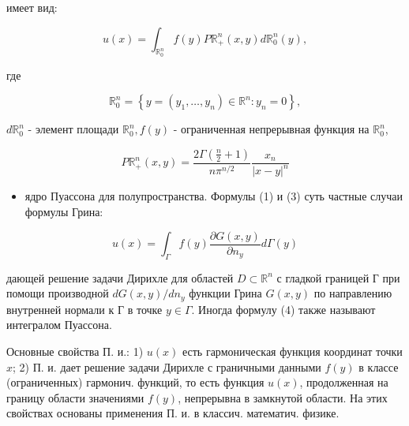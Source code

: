 \documentclass[10pt]{article}
\begin{document}
имеет вид:



\[

u(x)=\int_{\mathbb{R}_{0}^{n}} f(y) P \mathbb{R}_{+}^{n}(x, y) d \mathbb{R}_{0}^{n}(y),

\]



где



\[

\mathbb{R}_{0}^{n}=\left\{y=\left(y_{1}, \ldots, y_{n}\right) \in \mathbb{R}^{n}: y_{n}=0\right\},

\]



$d \mathbb{R}_{0}^{n}$ - элемент площади $\mathbb{R}_{0}^{n}, f(y)$ - ограниченная непрерывная функция на $\mathbb{R}_{0}^{n}$,



\[

P \mathbb{R}_{+}^{n}(x, y)=\frac{2 \Gamma\left(\frac{n}{2}+1\right)}{n \pi^{n / 2}} \frac{x_{n}}{|x-y|^{n}}

\]



\begin{itemize}

  \item ядро Пуассона для полупространства. Формулы (1) и (3) суть частные случаи формулы Грина:

\end{itemize}



\[

u(x)=\int_{\Gamma} f(y) \frac{\partial G(x, y)}{\partial n_{y}} d \Gamma(y)

\]



дающей решение задачи Дирихле для областей $D \subset \mathbb{R}^{n}$ с гладкой границей Г при помощи производной $d G(x, y) / d n_{y}$ функции Грина $G(x, y)$ по направлению внутренней нормали к Г в точке $y \in \Gamma$. Иногда формулу (4) также называют интегралом Пуассона.



Основные свойства П. и.: 1) $u(x)$ есть гармоническая функция координат точки $x$; 2) П. и. дает решение задачи Дирихле с граничными данными $f(y)$ в классе (ограниченных) гармонич. функций, то есть функция $u(x)$, продолженная на границу области значениями $f(y)$, непрерывна в замкнутой области. На этих свойствах основаны применения П. и. в классич. математич. физике.
\end{document}
